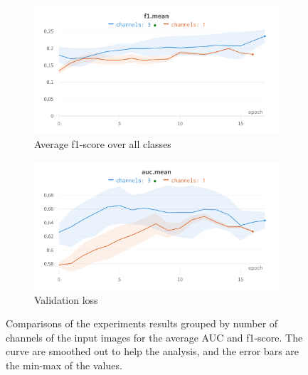 \documentclass[11pt]{article}
\begin{document}
                \begin{figure}[H]
                     \centering
                     \begin{subfigure}[b]{0.45\textwidth}
                         \centering
                         \includegraphics[width=\textwidth]{plots/channel_comparison_f1}
                         \caption{Average f1-score over all classes}
                         \vspace{4ex}
                         \label{fig:channel_comparison_f1}
                     \end{subfigure}
                     \hfill
                     \begin{subfigure}[b]{0.45\textwidth}
                         \centering
                         \includegraphics[width=\textwidth]{plots/channel_comparison_auc}
                         \caption{Validation loss}
                         \vspace{4ex}
                         \label{fig:channel_comparison_auc}
                     \end{subfigure}
                     \label{fig:channel_comparison}
                     \caption{Comparisons of the experiments results grouped by number of channels
                         of the input images for the average AUC and f1-score. The curve are smoothed out to help the analysis, and the error bars are the min-max
                         of the values.}
                \end{figure}
\end{document}
